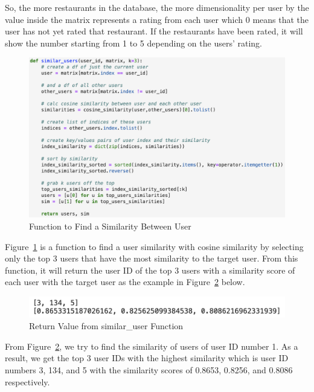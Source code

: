 \documentclass[12pt,oneside,openright,a4paper]{cpe-english-project}
\begin{document}
So, the more restaurants in the database, the more dimensionality per user by the value inside the matrix represents a rating from each user which 0 means that the user has not yet rated that restaurant. If the restaurants have been rated, it will show the number starting from 1 to 5 depending on the users’ rating.

\begin{figure}[H]\centering
\includegraphics[width=350pt]{./images/4FunctiontoFindaSimilarityBetweenUser.png}
\caption{Function to Find a Similarity Between User}\label{fig:4FunctiontoFindaSimilarityBetweenUser}
\end{figure}\vspace{-24pt}

Figure~\ref{fig:4FunctiontoFindaSimilarityBetweenUser} is a function to find a user similarity with cosine similarity by selecting only the top 3 users that have the most similarity to the target user. From this function, it will return the user ID of the top 3 users with a similarity score of each user with the target user as the example in Figure~\ref{fig:4ReturnValuefromsimilaruesrFunction} below.

\begin{figure}[H]\centering
\includegraphics[width=350pt]{./images/4ReturnValuefromsimilar_uesrFunction.png}
\caption{Return Value from similar\_user Function}\label{fig:4ReturnValuefromsimilaruesrFunction}
\end{figure}\vspace{-24pt}

From Figure~\ref{fig:4ReturnValuefromsimilaruesrFunction}, we try to find the similarity of users of user ID number 1. As a result, we get the top 3 user IDs with the highest similarity which is user ID numbers 3, 134, and 5 with the similarity scores of 0.8653, 0.8256, and 0.8086 respectively.
\end{document}
